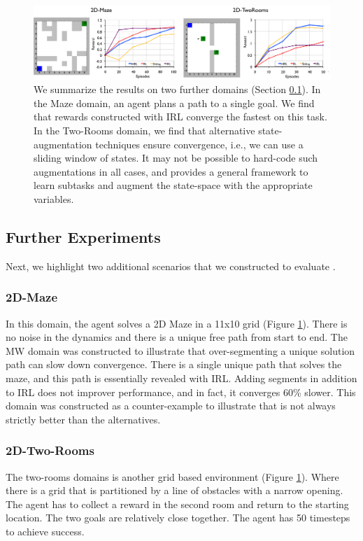 \begin{figure}[t]
\centering
 \includegraphics[width=\textwidth]{exp/counter-examples.png}
 \caption{We summarize the results on two further domains (Section \ref{exp:further}). In the Maze domain, an agent plans a path to a single goal. We find that rewards constructed with IRL converge the fastest on this task. In the Two-Rooms domain, we find that alternative state-augmentation techniques ensure convergence, i.e., we can use a sliding window of states. It may not be possible to hard-code such augmentations in all cases, and \hirl provides a general framework to learn subtasks and augment the state-space with the appropriate variables.}
 \label{exp:gw2}
\end{figure}

\subsection{Further Experiments}\label{exp:further}
Next, we highlight two additional scenarios that we constructed to evaluate \hirl.

\subsubsection{2D-Maze} In this domain, the agent solves a 2D Maze in a 11x10 grid (Figure \ref{exp:gw2}). There is no noise in the dynamics and there is a unique free path from start to end.
The MW domain was constructed to illustrate that over-segmenting a unique solution path can slow down convergence.
There is a single unique path that solves the maze, and this path is essentially revealed with IRL. Adding segments in addition to IRL does not improver performance, and in fact, it converges 60\% slower.
This domain was constructed as a counter-example to illustrate that \hirl is not always strictly better than the alternatives.

\subsubsection{2D-Two-Rooms} The two-rooms domains is another grid based environment (Figure \ref{exp:gw2}). 
Where there is a grid that is partitioned by a line of obstacles with a narrow opening. 
The agent has to collect a reward in the second room and return to the starting location.
The two goals are relatively close together.
The agent has 50 timesteps to achieve success.

